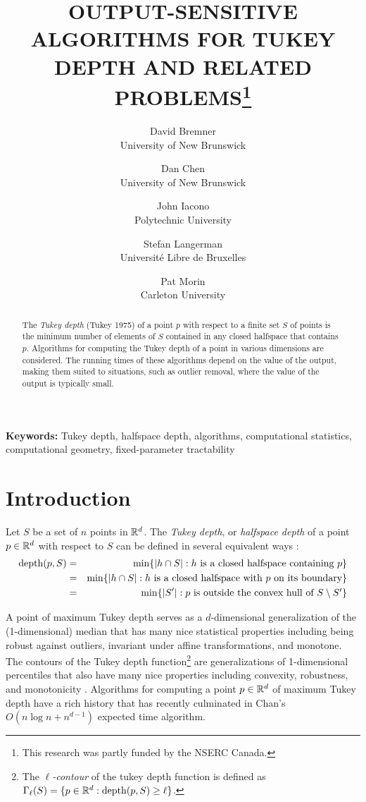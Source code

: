 \documentclass[charterfonts,lotsofwhite]{patmorin}
\title{\MakeUppercase{Output-Sensitive Algorithms for Tukey Depth and
        Related Problems}\thanks{This research was partly funded by
	the NSERC Canada.}}
\author{David Bremner \\ University of New Brunswick \and
        Dan Chen \\ University of New Brunswick \and
	John Iacono \\ Polytechnic University \and
	Stefan Langerman \\ Universit\'e Libre de Bruxelles \and
	Pat Morin \\ Carleton University}
\date{}
\DeclareMathOperator{\td}{depth}
\begin{document}
\maketitle

\begin{abstract}
The \emph{Tukey depth} (Tukey 1975) of a point $p$ with respect to a
finite set $S$ of points is the minimum number of elements of $S$
contained in any closed halfspace that contains $p$.  Algorithms for
computing the Tukey depth of a point in various dimensions are
considered. The running times of these algorithms depend on the value
of the output, making them suited to situations, such as outlier
removal, where the value of the output is typically small.
\end{abstract}

\noindent\textbf{Keywords:}
Tukey depth, halfspace depth, algorithms, computational statistics, 
computational geometry, fixed-parameter tractability

\section{Introduction}

Let $S$ be a set of $n$ points in $\mathbb{R}^d$.
The \emph{Tukey depth}, or \emph{halfspace depth} of a point $p\in\mathbb{R}^d$ with
respect to $S$ can be defined in several equivalent ways \cite{t75}:
\begin{eqnarray}
\td(p,S) & = & \min\{ |h\cap S| :
	             \mbox{$h$ is a closed halfspace containing $p$} \} 
                       \eqlabel{tuk-orig} \\ 
            & = & \min\{ |h\cap S| :
                      \mbox{$h$ is a closed halfspace 
                            with $p$ on its boundary} \} 
                        \eqlabel{tuk-boundary} \\ 
            & = & \min\{ |S'| :
                      \mbox{$p$ is outside the convex hull of 
                           $S\setminus S'$} \}
                      \eqlabel{tuk-hull}
\end{eqnarray}

A point of maximum Tukey depth serves as a $d$-dimensional
generalization of the (1-dimensional) median that has many nice
statistical properties including being robust against outliers,
invariant under affine transformations, and monotone.  The contours of
the Tukey depth function\footnote{The \emph{$\ell$-contour} of the
tukey depth function is defined as $\Gamma_\ell(S)=\{p\in\R^d :
\td(p,S)\ge \ell\}$.}  are generalizations of 1-dimensional
percentiles that also have many nice properties including convexity,
robustness, and monotonicity \cite{rr98,rr96,s90}.  Algorithms for
computing a point $p\in\mathbb{R}^d$ of maximum Tukey depth have a rich
history \cite{m91,ls03,c04} that has recently culminated in Chan's
$O(n\log n + n^{d-1})$ expected time algorithm.  
\end{document}
